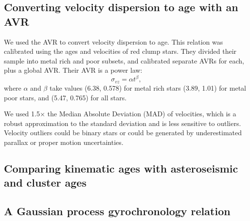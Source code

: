 \subsection{Converting velocity dispersion to age with an AVR}
\label{sec:avr}
We used the \citet{yu2018} AVR to convert velocity dispersion to age.
This relation was calibrated using the ages and velocities of red clump stars.
They divided their sample into metal rich and poor subsets, and calibrated
separate AVRs for each, plus a global AVR.
Their AVR is a power law:
\begin{equation}
    \sigma_{vz} = \alpha t ^\beta,
\end{equation}
where $\alpha$ and $\beta$ take values (6.38, 0.578) for metal rich stars
(3.89, 1.01) for metal poor stars, and (5.47, 0.765) for all stars.

We used 1.5$\times$ the Median Absolute Deviation (MAD) of velocities, which
is a robust approximation to the standard deviation and is less sensitive to
outliers.
Velocity outliers could be binary stars or could be generated by
underestimated parallax or proper motion uncertainties.

\subsection{Comparing kinematic ages with asteroseismic and cluster ages}

\subsection{A Gaussian process gyrochronology relation}
\label{sec:gp_model}

